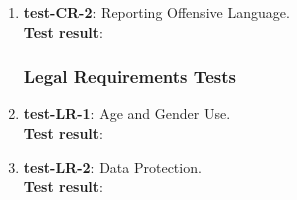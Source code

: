 \documentclass[12pt, titlepage]{article}
\begin{document}
\begin{enumerate}
	\item{\textbf{test-CR-2}}: Reporting Offensive Language.\\
	\textbf{Test result}:
	
\subsubsection{Legal Requirements Tests}
	\item{\textbf{test-LR-1}}: Age and Gender Use.\\
	\textbf{Test result}:
	
	\item{\textbf{test-LR-2}}: Data Protection.\\
	\textbf{Test result}:
	
\end{enumerate}
	
%
\end{document}
